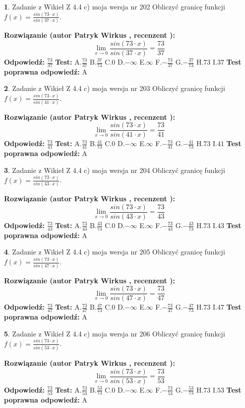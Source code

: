\documentclass[12pt, a4paper]{article}
\theoremstyle{definition} %
\newtheorem{zad}{}
\newcommand{\zadStart}[1]{\begin{zad}#1\newline}
\newcommand{\zadStop}{\end{zad}}
\newcommand{\rozwStart}[2]{\noindent \textbf{Rozwiązanie (autor #1 , recenzent #2): }\newline}
\newcommand{\rozwStop}{\newline}
\newcommand{\odpStart}{\noindent \textbf{Odpowiedź:}\newline}
\newcommand{\odpStop}{\newline}
\newcommand{\testStart}{\noindent \textbf{Test:}\newline}
\newcommand{\testStop}{\newline}
\newcommand{\kluczStart}{\noindent \textbf{Test poprawna odpowiedź:}\newline}
\newcommand{\kluczStop}{\newline}
\begin{document}
\zadStart{Zadanie z Wikieł Z 4.4 c) moja wersja nr 202}
Obliczyć granicę funkcji $f(x)=\frac{sin(73\cdot x)}{sin(37\cdot x)}$.
\zadStop
\rozwStart{Patryk Wirkus}{}
$$\lim\limits_{x\to 0}\frac{sin(73\cdot x)}{sin(37\cdot x)}=
\frac{73}{37}$$
\rozwStop
\odpStart
$\frac{73}{37}$
\odpStop
\testStart
A.$\frac{73}{37}$
B.$\frac{37}{73}$
C.$0$
D.$-\infty$
E.$\infty$
F.$-\frac{73}{37}$
G.$-\frac{37}{73}$
H.$73$
I.$37$
\testStop
\kluczStart
A
\kluczStop



\zadStart{Zadanie z Wikieł Z 4.4 c) moja wersja nr 203}
Obliczyć granicę funkcji $f(x)=\frac{sin(73\cdot x)}{sin(41\cdot x)}$.
\zadStop
\rozwStart{Patryk Wirkus}{}
$$\lim\limits_{x\to 0}\frac{sin(73\cdot x)}{sin(41\cdot x)}=
\frac{73}{41}$$
\rozwStop
\odpStart
$\frac{73}{41}$
\odpStop
\testStart
A.$\frac{73}{41}$
B.$\frac{41}{73}$
C.$0$
D.$-\infty$
E.$\infty$
F.$-\frac{73}{41}$
G.$-\frac{41}{73}$
H.$73$
I.$41$
\testStop
\kluczStart
A
\kluczStop



\zadStart{Zadanie z Wikieł Z 4.4 c) moja wersja nr 204}
Obliczyć granicę funkcji $f(x)=\frac{sin(73\cdot x)}{sin(43\cdot x)}$.
\zadStop
\rozwStart{Patryk Wirkus}{}
$$\lim\limits_{x\to 0}\frac{sin(73\cdot x)}{sin(43\cdot x)}=
\frac{73}{43}$$
\rozwStop
\odpStart
$\frac{73}{43}$
\odpStop
\testStart
A.$\frac{73}{43}$
B.$\frac{43}{73}$
C.$0$
D.$-\infty$
E.$\infty$
F.$-\frac{73}{43}$
G.$-\frac{43}{73}$
H.$73$
I.$43$
\testStop
\kluczStart
A
\kluczStop



\zadStart{Zadanie z Wikieł Z 4.4 c) moja wersja nr 205}
Obliczyć granicę funkcji $f(x)=\frac{sin(73\cdot x)}{sin(47\cdot x)}$.
\zadStop
\rozwStart{Patryk Wirkus}{}
$$\lim\limits_{x\to 0}\frac{sin(73\cdot x)}{sin(47\cdot x)}=
\frac{73}{47}$$
\rozwStop
\odpStart
$\frac{73}{47}$
\odpStop
\testStart
A.$\frac{73}{47}$
B.$\frac{47}{73}$
C.$0$
D.$-\infty$
E.$\infty$
F.$-\frac{73}{47}$
G.$-\frac{47}{73}$
H.$73$
I.$47$
\testStop
\kluczStart
A
\kluczStop



\zadStart{Zadanie z Wikieł Z 4.4 c) moja wersja nr 206}
Obliczyć granicę funkcji $f(x)=\frac{sin(73\cdot x)}{sin(53\cdot x)}$.
\zadStop
\rozwStart{Patryk Wirkus}{}
$$\lim\limits_{x\to 0}\frac{sin(73\cdot x)}{sin(53\cdot x)}=
\frac{73}{53}$$
\rozwStop
\odpStart
$\frac{73}{53}$
\odpStop
\testStart
A.$\frac{73}{53}$
B.$\frac{53}{73}$
C.$0$
D.$-\infty$
E.$\infty$
F.$-\frac{73}{53}$
G.$-\frac{53}{73}$
H.$73$
I.$53$
\testStop
\kluczStart
A
\kluczStop
\end{document}
